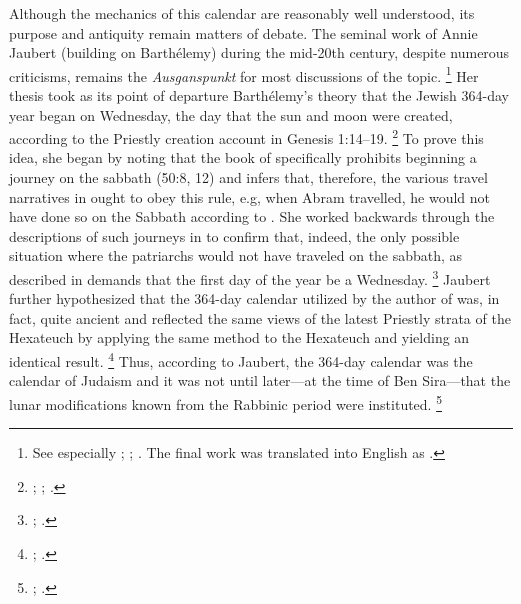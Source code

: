 Although the mechanics of this calendar are reasonably well understood, its purpose and antiquity remain matters of debate. The seminal work of Annie Jaubert (building on Barthélemy) during the mid-20th century, despite numerous criticisms, remains the \emph{Ausganspunkt} for most discussions of the topic.%
    \footnote{See especially
        \cite{jaubert_vt1953};
        \cite{jaubert_vt1957};
        \cite{jaubert1957}.
        The final work was translated into English as
        \cite*{jaubert1965}.}
Her thesis took as its point of departure Barthélemy's theory that the Jewish 364-day year began on Wednesday, the day that the sun and moon were created, according to the Priestly creation account in Genesis 1:14--19.%
    \footnote{%
        \cite{barthelemy_rb1952};
        \cite[250]{jaubert_vt1953};
        \cite[24--25]{jaubert1965}.}
To prove this idea, she began by noting that the book of \jub specifically prohibits beginning a journey on the sabbath (50:8, 12) and infers that, therefore, the various travel narratives in \jub ought to obey this rule, e.g, when Abram travelled, he would not have done so on the Sabbath according to \jub. She worked backwards through the descriptions of such journeys in \jub to confirm that, indeed, the only possible situation where the patriarchs would not have traveled on the sabbath, as described in \jub demands that the first day of the year be a Wednesday.%
    \footnote{%
        \cite[252--254]{jaubert_vt1953};
        \cite[25--27]{jaubert1965}.}
Jaubert further hypothesized that the 364-day calendar utilized by the author of \jub was, in fact, quite ancient and reflected the same views of the latest Priestly strata of the Hexateuch by applying the same method to the Hexateuch and yielding an identical result.%
    \footnote{%
        \cite[258]{jaubert_vt1953};
        \cite[33]{jaubert1965}.}
Thus, according to Jaubert, the 364-day calendar was the calendar of \secondtemple Judaism and it was not until later---at the time of Ben Sira---that the lunar modifications known from the Rabbinic period were instituted.%
    \footnote{%
        \cite[254--258; 262--264]{jaubert_vt1953};
        \cite[47--51]{jaubert1965}.}

